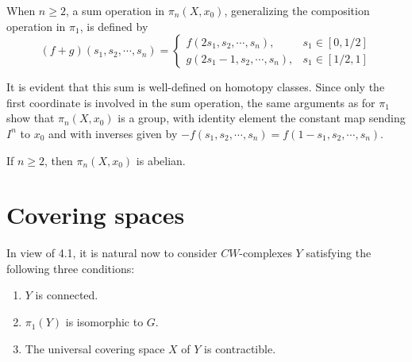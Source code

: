 When $n \geq 2$, a sum operation in $\pi_n\left(X, x_0\right)$, generalizing the composition operation in $\pi_1$, is defined by
$$
(f+g)\left(s_1, s_2, \cdots, s_n\right)= \begin{cases}f\left(2 s_1, s_2, \cdots, s_n\right), & s_1 \in[0,1 / 2] \\ g\left(2 s_1-1, s_2, \cdots, s_n\right), & s_1 \in[1 / 2,1]\end{cases}
$$

It is evident that this sum is well-defined on homotopy classes. Since only the first coordinate is involved in the sum operation, the same arguments as for $\pi_1$ show that $\pi_n\left(X, x_0\right)$ is a group, with identity element the constant map sending $I^n$ to $x_0$ and with inverses given by $-f\left(s_1, s_2, \cdots, s_n\right)=f\left(1-s_1, s_2, \cdots, s_n\right)$.


\begin{prop}
    If $n \geq 2$, then $\pi_n\left(X, x_0\right)$ is abelian.
\end{prop}


\section{Covering spaces}


In view of 4.1, it is natural now to consider $C W$-complexes $Y$ satisfying the following three conditions:
\begin{enumerate}
    \item $Y$ is connected.
    \item $\pi_1(Y)$ is isomorphic to $G$.
    \item The universal covering space $X$ of $Y$ is contractible.
\end{enumerate}

